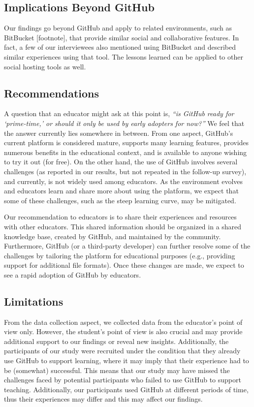 \subsection{Implications Beyond GitHub}
Our findings go beyond GitHub and apply to related environments, such as BitBucket [footnote], that provide similar social and collaborative features. In fact, a few of our interviewees also mentioned using BitBucket and described similar experiences using that tool. The lessons learned can be applied to other social hosting tools as well.

\subsection{Recommendations}
A question that an educator might ask at this point is, \textit{``is GitHub ready for `prime-time,' or should it only be used by early adopters for now?''} We feel that the answer currently lies somewhere in between. From one aspect, GitHub's current platform is considered mature, supports many learning features, provides numerous benefits in the educational context, and is available to anyone wishing to try it out (for free). On the other hand, the use of GitHub involves several challenges (as reported in our results, but not repeated in the follow-up survey), and currently, is not widely used among educators. As the environment evolves and educators learn and share more about using the platform, we expect that some of these challenges, such as the steep learning curve, may be mitigated.

Our recommendation to educators is to share their experiences and resources with other educators. This shared information should be organized in a shared knowledge base, created by GitHub, and maintained by the community. Furthermore, GitHub (or a third-party developer) can further resolve some of the challenges by tailoring the platform for educational purposes (e.g., providing support for additional file formats). Once these changes are made, we expect to see a rapid adoption of GitHub by educators.

\subsection{Limitations}
\label{sec:limitations}
From the data collection aspect, we collected data from the educator's point of view only. However, the student's point of view is also crucial and may provide additional support to our findings or reveal new insights. Additionally, the participants of our study were recruited under the condition that they already use GitHub to support learning, where it may imply that their experience had to be (somewhat) successful. This means that our study may have missed the challenges faced by potential participants who failed to use GitHub to support teaching. Additionally, our participants used GitHub at different periods of time, thus their experiences may differ and this may affect our findings.

